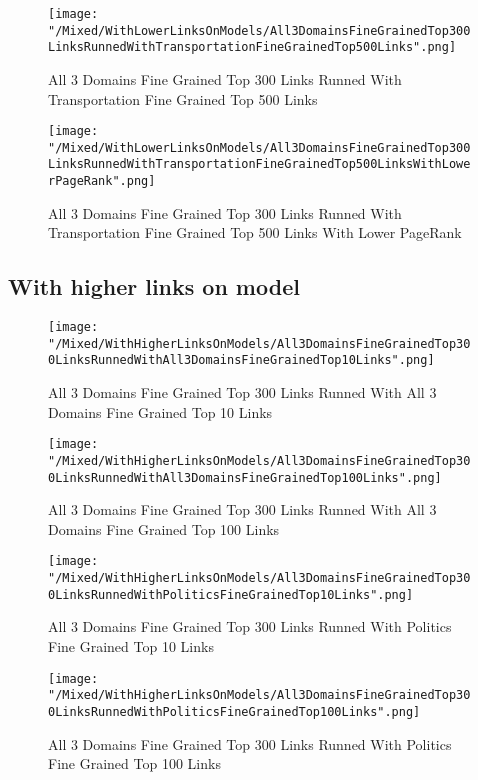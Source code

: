 \documentclass[thesis=M,english]{FITthesis}[2018/05/30]
\begin{document}
	\begin{figure}\centering
		\texttt{[image: "/Mixed/WithLowerLinksOnModels/All3DomainsFineGrainedTop300LinksRunnedWithTransportationFineGrainedTop500Links".png]}
		\caption{All 3 Domains Fine Grained Top 300 Links Runned With Transportation Fine Grained Top 500 Links}\label{}
	\end{figure}
	
	\begin{figure}\centering
		\texttt{[image: "/Mixed/WithLowerLinksOnModels/All3DomainsFineGrainedTop300LinksRunnedWithTransportationFineGrainedTop500LinksWithLowerPageRank".png]}
		\caption{All 3 Domains Fine Grained Top 300 Links Runned With Transportation Fine Grained Top 500 Links With Lower PageRank}\label{}
	\end{figure}
\subsection{With higher links on model}	
	\begin{figure}[!htb]\centering
		\texttt{[image: "/Mixed/WithHigherLinksOnModels/All3DomainsFineGrainedTop300LinksRunnedWithAll3DomainsFineGrainedTop10Links".png]}
		\caption{All 3 Domains Fine Grained Top 300 Links Runned With All 3 Domains Fine Grained Top 10 Links}\label{}
	\end{figure}
	
	\begin{figure}[!htb]\centering
		\texttt{[image: "/Mixed/WithHigherLinksOnModels/All3DomainsFineGrainedTop300LinksRunnedWithAll3DomainsFineGrainedTop100Links".png]}
		\caption{All 3 Domains Fine Grained Top 300 Links Runned With All 3 Domains Fine Grained Top 100 Links}\label{}
	\end{figure}
	
	\begin{figure}[!htb]\centering
		\texttt{[image: "/Mixed/WithHigherLinksOnModels/All3DomainsFineGrainedTop300LinksRunnedWithPoliticsFineGrainedTop10Links".png]}
		\caption{All 3 Domains Fine Grained Top 300 Links Runned With Politics Fine Grained Top 10 Links}\label{}
	\end{figure}
		
	\begin{figure}[!htb]\centering
		\texttt{[image: "/Mixed/WithHigherLinksOnModels/All3DomainsFineGrainedTop300LinksRunnedWithPoliticsFineGrainedTop100Links".png]}
		\caption{All 3 Domains Fine Grained Top 300 Links Runned With Politics Fine Grained Top 100 Links}\label{}
	\end{figure}
	
\end{document}
